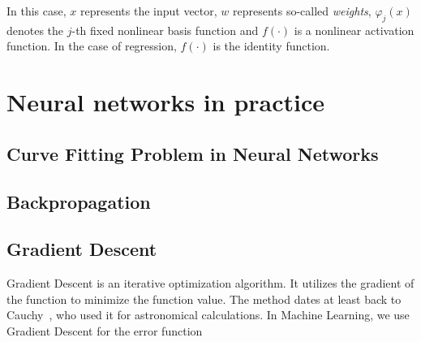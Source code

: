 In this case, $x$ represents the input vector, $w$ represents so-called \emph{weights}, $\varphi_j(x)$ denotes the $j$-th fixed nonlinear basis function and $f(\cdot)$ is a nonlinear activation function. In the case of regression, $f(\cdot)$ is the identity function.



\section{Neural networks in practice}

\subsection{Curve Fitting Problem in Neural Networks}


\subsection{Backpropagation}


\subsection{Gradient Descent}

Gradient Descent is an iterative optimization algorithm. It utilizes the gradient
of the function to minimize the function value. The method dates at least back to
Cauchy~\cite{cauchy-gd}, who used it for astronomical calculations.
In Machine Learning, we use Gradient
Descent for the error function



